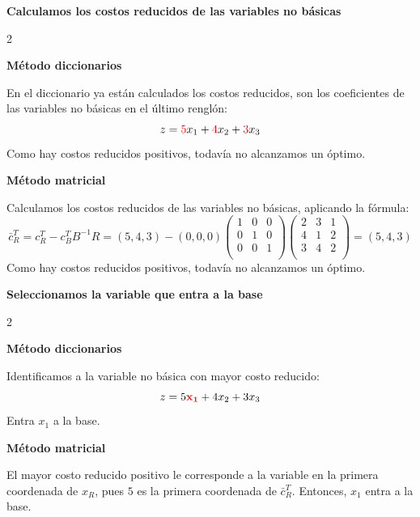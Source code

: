 \documentclass{article}
\newcommand{\binv}{B^{-1}}
\begin{document}
    \begin{center}
        \textbf{Calculamos los costos reducidos de las variables no básicas}
    \end{center}
    \begin{multicols}{2}
        \raggedcolumns
        \begin{center}
            \textbf{Método diccionarios}
        \end{center}

        En el diccionario ya están calculados los costos reducidos, son los coeficientes de las variables no básicas
        en el último renglón:
        \[z    =         {\color{red}5}x_1  +  {\color{red}4}x_2  +  {\color{red}3}x_3\]
        Como hay costos reducidos positivos, todavía no alcanzamos un óptimo.
        \columnbreak
        \begin{center}
            \textbf{Método matricial}
        \end{center}

        Calculamos los costos reducidos de las variables no básicas, aplicando la fórmula:
        \[\bar{c}_R^T = c_R^T - c_B^T\binv R =
        (5,4,3) - (0,0,0)
        \begin{pmatrix}
                1 & 0 & 0 \\
                0 & 1 & 0 \\
                0 & 0 & 1 \\
        \end{pmatrix}
        \begin{pmatrix}
                2 & 3 & 1 \\
                4 & 1 & 2 \\
                3 & 4 & 2 \\
        \end{pmatrix} = (5,4,3)
        \]
        Como hay costos reducidos positivos, todavía no alcanzamos un óptimo.
    \end{multicols}

    \begin{center}
        \textbf{Seleccionamos la variable que entra a la base}
    \end{center}
    \begin{multicols}{2}
        \raggedcolumns
        \begin{center}
            \textbf{Método diccionarios}
        \end{center}

        Identificamos a la variable no básica con mayor costo reducido:
        \[z    =         5{\color{red}\mathbf{x_1}}  +  4x_2  +  3x_3\]
        Entra $x_1$ a la base.
        \columnbreak
        \begin{center}
            \textbf{Método matricial}
        \end{center}

        El mayor costo reducido positivo le corresponde a la variable en la primera coordenada de $x_R$, pues $5$ es
        la primera coordenada de $\bar{c}_R^T$.
        Entonces, $x_1$ entra a la base.
    \end{multicols}
\end{document}
